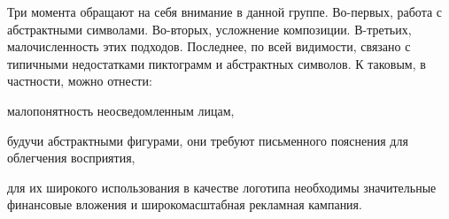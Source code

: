 Три момента обращают на себя внимание в данной группе. Во-первых, работа с абстрактными
символами. Во-вторых, усложнение композиции. В-третьих, малочисленность этих подходов. Последнее, по
всей видимости, связано с типичными недостатками пиктограмм и абстрактных символов. К таковым, в
частности, можно отнести:
\begin{enumerate*}[label=\asbuk*)]
\item малопонятность неосведомленным лицам,
\item будучи абстрактными фигурами, они требуют письменного пояснения для облегчения восприятия,
\item для их широкого использования в качестве логотипа необходимы значительные финансовые
  вложения и широкомасштабная рекламная кампания.
\end{enumerate*}

